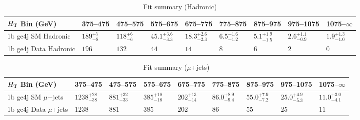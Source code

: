 \documentclass[8pt]{article}
\def\scalht{\mbox{$H_{\rm{T}}$}\xspace}
\newcommand\T{\rule{0pt}{2.6ex}}
\begin{document}
\begin{table}[ht!]
\caption{Fit summary (Hadronic)}
\label{tab:ensemble-summary}
\centering
\begin{tabular}{ lllllllll }

\hline
\scalht Bin (GeV)       & 375--475                       & 475--575                       & 575--675                       & 675--775                       & 775--875                       & 875--975                       & 975--1075                      & 1075--$\infty$                 \\ [1.000000ex]
\hline
1b ge4j SM Hadronic\T   & $189^{+7}_{-8}$                & $118^{+6}_{-6}$                & $45.1^{+3.6}_{-3.3}$           & $18.3^{+2.6}_{-2.3}$           & $6.5^{+1.6}_{-1.2}$            & $5.1^{+1.9}_{-1.5}$            & $2.6^{+1.1}_{-0.9}$            & $1.9^{+1.3}_{-1.0}$            \\ 
1b ge4j Data Hadronic\T & $196$                          & $132$                          & $44$                           & $14$                           & $8$                            & $6$                            & $2$                            & $0$                            \\ 
\hline

\end{tabular}
\end{table}
\begin{table}[ht!]
\caption{Fit summary ($\mu$+jets)}
\label{tab:ensemble-summary}
\centering
\begin{tabular}{ lllllllll }

\hline
\scalht Bin (GeV)       & 375--475                       & 475--575                       & 575--675                       & 675--775                       & 775--875                       & 875--975                       & 975--1075                      & 1075--$\infty$                 \\ [1.000000ex]
\hline
1b ge4j SM $\mu$+jets\T & $1238^{+28}_{-38}$             & $881^{+32}_{-33}$              & $385^{+18}_{-18}$              & $202^{+13}_{-14}$              & $86.0^{+8.9}_{-9.4}$           & $55.0^{+7.9}_{-7.2}$           & $25.0^{+4.9}_{-5.3}$           & $11.0^{+3.0}_{-4.1}$           \\ 
1b ge4j Data $\mu$+jets\T & $1238$                         & $881$                          & $385$                          & $202$                          & $86$                           & $55$                           & $25$                           & $11$                           \\ 
\hline

\end{tabular}
\end{table}
\end{document}
